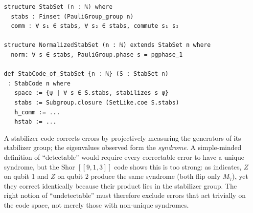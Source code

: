\begin{lstlisting}
structure StabSet (n : ℕ) where
  stabs : Finset (PauliGroup_group n)
  comm : ∀ s₁ ∈ stabs, ∀ s₂ ∈ stabs, commute s₁ s₂

structure NormalizedStabSet (n : ℕ) extends StabSet n where
  norm: ∀ s ∈ stabs, PauliGroup.phase s = pgphase_1

def StabCode_of_StabSet {n : ℕ} (S : StabSet n)
 : StabCode n where
   space := {ψ | ∀ s ∈ S.stabs, stabilizes s ψ}
   stabs := Subgroup.closure (SetLike.coe S.stabs)
   h_comm := ...
   hstab := ...
\end{lstlisting}

%
%

A stabilizer code corrects errors by projectively measuring the generators of
its stabilizer group; the eigenvalues observed form the \emph{syndrome}. A
simple-minded definition of ``detectable'' would require every correctable error
to have a unique syndrome, but the Shor $[[9,1,3]]$ code shows this is too
strong: as  indicates, $Z$ on qubit 1 and $Z$ on
qubit 2 produce the same syndrome (both flip only $M_7$), yet they correct
identically because their product lies in the stabilizer group. The right notion
of ``undetectable'' must therefore exclude errors that act trivially on the code
space, not merely those with non-unique syndromes.

